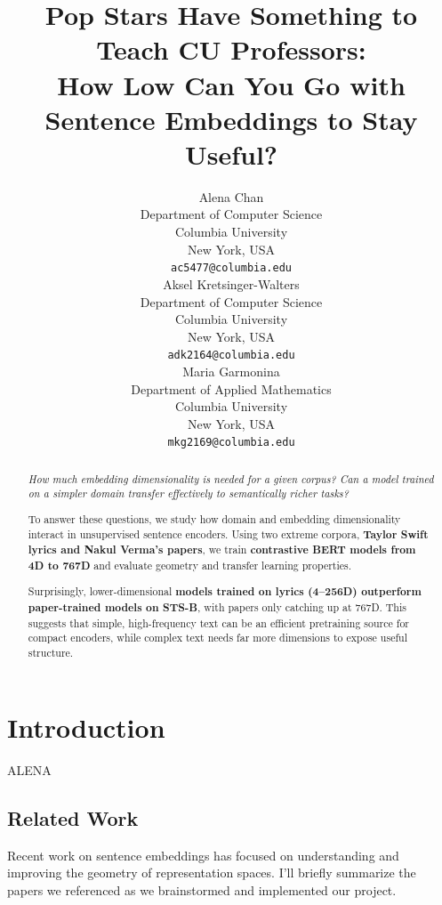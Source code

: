 \documentclass{article}
\title{Pop Stars Have Something to Teach CU Professors: \\
\large{How Low Can You Go with Sentence Embeddings to Stay Useful?}}
\begin{document}
\author{%
  Alena Chan \\
  Department of Computer Science \\
  Columbia University \\
  New York, USA \\
  \texttt{ac5477@columbia.edu} \\
  \And
  Aksel Kretsinger-Walters \\
  Department of Computer Science \\
  Columbia University \\
  New York, USA \\
  \texttt{adk2164@columbia.edu} \\
  \And
  Maria Garmonina \\
  Department of Applied Mathematics \\
  Columbia University \\
  New York, USA \\
  \texttt{mkg2169@columbia.edu} \\
}

\maketitle

\begin{abstract}
		\textit{How much embedding dimensionality is needed for a given corpus? Can a model
		trained on a simpler domain transfer effectively to semantically richer tasks?}

		To answer these questions, we study how domain and embedding dimensionality interact in
		unsupervised sentence encoders. Using two extreme corpora, \textbf{Taylor Swift lyrics
		and Nakul Verma's papers}, we train \textbf{contrastive BERT models from 4D to 767D}
		and evaluate geometry and transfer learning properties.

		Surprisingly, lower-dimensional \textbf{models trained on lyrics (4–256D) outperform
		paper-trained models on STS-B}, with papers only catching up at 767D. This suggests
		that simple, high-frequency text can be an efficient pretraining source for compact
		encoders, while complex text needs far more dimensions to expose useful structure.
\end{abstract}

\section{Introduction}
ALENA

\subsection{Related Work}
Recent work on sentence embeddings has focused on understanding and improving the
geometry of representation spaces. I'll briefly summarize the papers we referenced as we
brainstormed and implemented our project.
\end{document}
